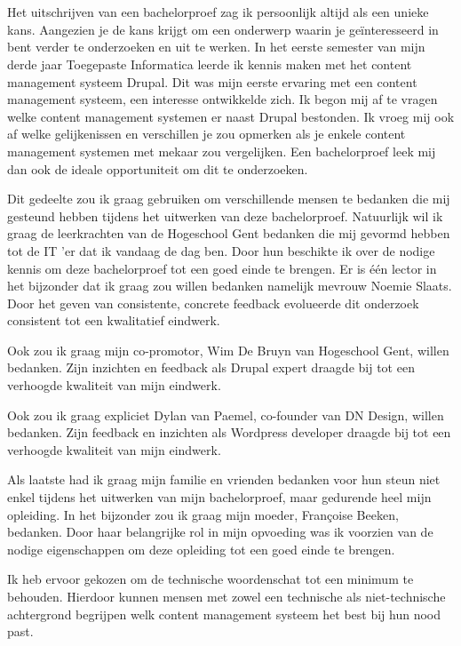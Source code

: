 
\chapter*{}
\label{ch:voorwoord}

Het uitschrijven van een bachelorproef zag ik persoonlijk altijd als een unieke kans. Aangezien je de kans krijgt om een onderwerp waarin je geïnteresseerd in bent verder te onderzoeken en uit te werken. In het eerste semester van mijn derde jaar Toegepaste Informatica leerde ik kennis maken met het content management systeem Drupal. Dit was mijn eerste ervaring met een content management systeem, een interesse ontwikkelde zich. Ik begon mij af te vragen welke content management systemen er naast Drupal bestonden. Ik vroeg mij ook af welke gelijkenissen en verschillen je zou opmerken als je enkele content management systemen met mekaar zou vergelijken. Een bachelorproef leek mij dan ook de ideale opportuniteit om dit te onderzoeken.

Dit gedeelte zou ik graag gebruiken om verschillende mensen te bedanken die mij gesteund hebben tijdens het uitwerken van deze bachelorproef. Natuurlijk wil ik graag de leerkrachten van de Hogeschool Gent bedanken die mij gevormd hebben tot de IT 'er dat ik vandaag de dag ben. Door hun beschikte ik over de nodige kennis om deze bachelorproef tot een goed einde te brengen. Er is één lector in het bijzonder dat ik graag zou willen bedanken namelijk mevrouw Noemie Slaats. Door het geven van consistente, concrete feedback evolueerde dit onderzoek consistent tot een kwalitatief eindwerk.

Ook zou ik graag mijn co-promotor, Wim De Bruyn van Hogeschool Gent, willen bedanken. Zijn inzichten en feedback als Drupal expert draagde bij tot een verhoogde kwaliteit van mijn eindwerk.

Ook zou ik graag expliciet Dylan van Paemel, co-founder van DN Design, willen bedanken. Zijn feedback en inzichten als Wordpress developer draagde bij tot een verhoogde kwaliteit van mijn eindwerk.

Als laatste had ik graag mijn familie en vrienden bedanken voor hun steun niet enkel tijdens het uitwerken van mijn bachelorproef, maar gedurende heel mijn opleiding. In het bijzonder zou ik graag mijn moeder, Françoise Beeken, bedanken. Door haar belangrijke rol in mijn opvoeding was ik voorzien van de nodige eigenschappen om deze opleiding tot een goed einde te brengen.

Ik heb ervoor gekozen om de technische woordenschat tot een minimum te behouden. Hierdoor kunnen mensen met zowel een technische als niet-technische achtergrond begrijpen welk content management systeem het best bij hun nood past.
